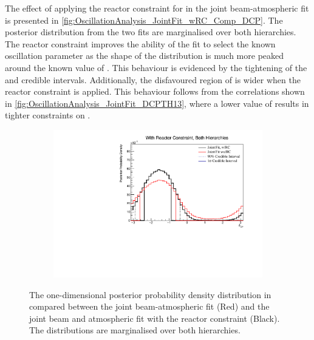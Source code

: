 The effect of applying the reactor constraint for  in the joint beam-atmospheric fit is presented in \autoref{fig:OscillationAnalysis_JointFit_wRC_Comp_DCP}. The posterior distribution from the two fits are marginalised over both hierarchies. The reactor constraint improves the ability of the fit to select the known oscillation parameter as the shape of the distribution is much more peaked around the known value of . This behaviour is evidenced by the tightening of the \quickmath{1\sigma} and  credible intervals. Additionally, the disfavoured region of  is wider when the reactor constraint is applied. This behaviour follows from the correlations shown in \autoref{fig:OscillationAnalysis_JointFit_DCPTH13}, where a lower value of  results in tighter constraints on . 

\begin{figure}[h]
  \begin{subfigure}[t]{0.98\textwidth}
    \includegraphics[width=\textwidth, trim={0mm 0mm 0mm 0mm}, clip,page=1]{Figures/OA/JointFit_wRC_Comp/ContourComparison_1D_dcp_BH_2_wRC_woRC_UnSmeared_CredibleInterval.pdf}
  \end{subfigure}
  \caption{The one-dimensional posterior probability density distribution in  compared between the joint beam-atmospheric fit (Red) and the joint beam and atmospheric fit with the reactor constraint (Black). The distributions are marginalised over both hierarchies.}
  \label{fig:OscillationAnalysis_JointFit_wRC_Comp_DCP}
\end{figure}

